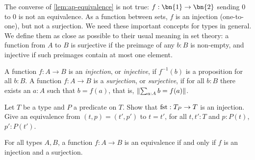 The converse of \cref{lem:ap-equivalence} is not
true: $f:\bn{1}\to\bn{2}$ sending $0$ to $0$ is not an
equivalence. As a function between sets,
$f$ is an injection (one-to-one), but not a surjection.
We need these important concepts for types in general.
We define them as close as possible to their
usual meaning in set theory: a function from $A$ to $B$ is 
surjective if the preimage of any $b:B$ is non-empty,
and injective if such preimages contain at most one element.

\begin{definition}\label{def:injection}
A function $f:A\to B$ is an \emph{injection}, or \emph{injective}, 
if $f^{-1}(b)$ is a proposition for all $b:B$.
A function $f:A\to B$ is a \emph{surjection}, or \emph{surjective},
if for all $b:B$ there exists an $a:A$ such that $b=f(a)$,
that is, $\lVert\sum_{a:A} b=f(a)\rVert$.
%
\end{definition}

\begin{xca}\label{xca:subtype-to-type-injection}
Let $T$ be a type and $P$ a predicate on $T$.
Show that $\fst : T_P \to T$ is an injection.
Give an equivalence from $(t,p)=(t',p')$ to $t=t'$, for all $t,t':T$ and
$p:P(t)$, $p':P(t')$.
\end{xca}

\begin{lemma}\label{lem:inj+surj}
For all types $A,B$, a function $f: A\to B$ is an equivalence 
if and only if $f$ is an injection and a surjection.
\end{lemma}

